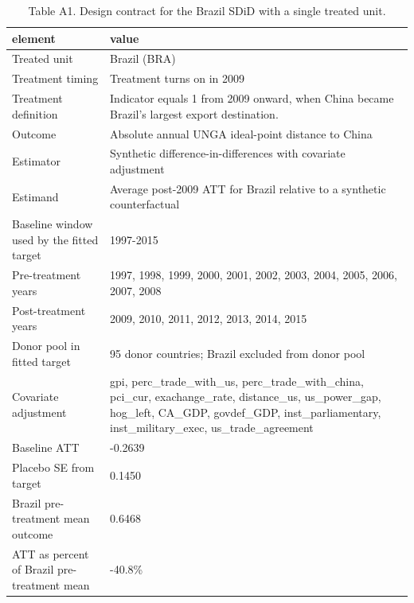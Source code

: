 \begin{table}

\caption{\label{tab:tab:sdid-design-contract}Table A1. Design contract for the Brazil SDiD with a single treated unit.}
\centering
\begin{tabular}[t]{ll}
\toprule
element & value\\
\midrule
Treated unit & Brazil (BRA)\\
Treatment timing & Treatment turns on in 2009\\
Treatment definition & Indicator equals 1 from 2009 onward, when China became Brazil's largest export destination.\\
Outcome & Absolute annual UNGA ideal-point distance to China\\
Estimator & Synthetic difference-in-differences with covariate adjustment\\
\addlinespace
Estimand & Average post-2009 ATT for Brazil relative to a synthetic counterfactual\\
Baseline window used by the fitted target & 1997-2015\\
Pre-treatment years & 1997, 1998, 1999, 2000, 2001, 2002, 2003, 2004, 2005, 2006, 2007, 2008\\
Post-treatment years & 2009, 2010, 2011, 2012, 2013, 2014, 2015\\
Donor pool in fitted target & 95 donor countries; Brazil excluded from donor pool\\
\addlinespace
Covariate adjustment & gpi, perc\_trade\_with\_us, perc\_trade\_with\_china, pci\_cur, exachange\_rate, distance\_us, us\_power\_gap, hog\_left, CA\_GDP, govdef\_GDP, inst\_parliamentary, inst\_military\_exec, us\_trade\_agreement\\
Baseline ATT & -0.2639\\
Placebo SE from target & 0.1450\\
Brazil pre-treatment mean outcome & 0.6468\\
ATT as percent of Brazil pre-treatment mean & -40.8\%\\
\bottomrule
\end{tabular}
\end{table}
